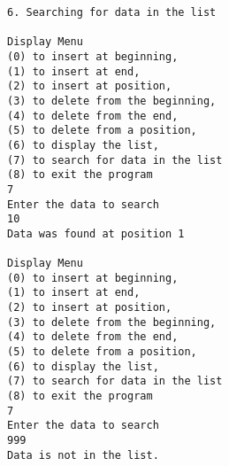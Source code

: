 \documentclass[12pt]{article}
\begin{document}
\begin{multicols}{2}
\begin{verbatim}
6. Searching for data in the list

Display Menu
(0) to insert at beginning,
(1) to insert at end,
(2) to insert at position,
(3) to delete from the beginning,
(4) to delete from the end,
(5) to delete from a position,
(6) to display the list,
(7) to search for data in the list
(8) to exit the program
7
Enter the data to search
10
Data was found at position 1

Display Menu
(0) to insert at beginning,
(1) to insert at end,
(2) to insert at position,
(3) to delete from the beginning,
(4) to delete from the end,
(5) to delete from a position,
(6) to display the list,
(7) to search for data in the list
(8) to exit the program
7
Enter the data to search
999
Data is not in the list.

\end{verbatim}
\end{multicols}
\end{document}
